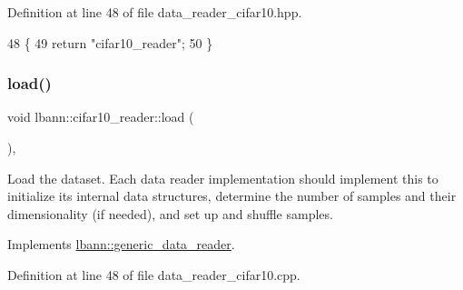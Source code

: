 Definition at line 48 of file data\+\_\+reader\+\_\+cifar10.\+hpp.


\begin{DoxyCode}
48                                       \{
49     \textcolor{keywordflow}{return} \textcolor{stringliteral}{"cifar10\_reader"};
50   \}
\end{DoxyCode}
\mbox{\label{classlbann_1_1cifar10__reader_aee797d547e651e1b0fd5dedc95edd0e0}} 
\subsubsection{\texorpdfstring{load()}{load()}}
{\footnotesize\ttfamily void lbann\+::cifar10\+\_\+reader\+::load (\begin{DoxyParamCaption}{ }\end{DoxyParamCaption})\hspace{0.3cm}{\ttfamily [override]}, {\ttfamily [virtual]}}

Load the dataset. Each data reader implementation should implement this to initialize its internal data structures, determine the number of samples and their dimensionality (if needed), and set up and shuffle samples. 

Implements \hyperlink{classlbann_1_1generic__data__reader_afeb47703d988a230a59859cbfc178215}{lbann\+::generic\+\_\+data\+\_\+reader}.



Definition at line 48 of file data\+\_\+reader\+\_\+cifar10.\+cpp.


